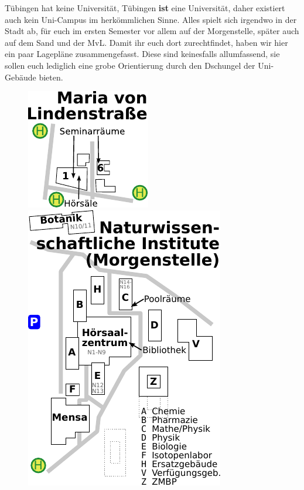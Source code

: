 Tübingen hat keine Universität, Tübingen \textbf{ist} eine Universität, daher
existiert auch kein Uni-Campus im herkömmlichen Sinne. Alles spielt sich
irgendwo in der Stadt ab, für euch im ersten Semester vor allem auf der
Morgenstelle, später auch auf dem Sand und der MvL. Damit ihr euch dort
zurechtfindet, haben wir hier ein paar Lagepläne zusammengefasst. Diese sind
keinesfalls allumfassend, sie sollen euch lediglich eine grobe Orientierung
durch den Dschungel der Uni-Gebäude bieten.

\begin{figure}[ht!]
	\begin{minipage}[t]{.5\linewidth}
		\centering
		\includegraphics[width=0.6\linewidth]{shared/anhang/lageplaene/uebersicht_mvl.pdf}
	\end{minipage}%
	\begin{minipage}[t]{.5\linewidth}
		\centering
		\includegraphics[width=0.9\linewidth]{shared/anhang/lageplaene/uebersicht_morgenstelle.pdf}

\end{minipage}
\end{figure}
